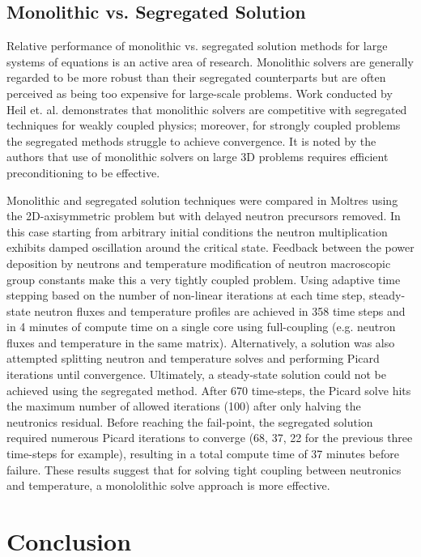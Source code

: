 \documentclass{article}
\let\Oldsection\section
\renewcommand{\section}{\FloatBarrier\Oldsection}
\let\Oldsubsection\subsection
\renewcommand{\subsection}{\FloatBarrier\Oldsubsection}
\begin{document}
\subsection{Monolithic vs. Segregated Solution}

Relative performance of monolithic vs. segregated solution methods for large
systems of equations is an active area of research. Monolithic solvers are
generally regarded to be more robust than their segregated counterparts but are
often perceived as being too expensive for large-scale problems. Work conducted
by Heil et. al. \cite{heil2008solvers} demonstrates that monolithic solvers are
competitive with segregated techniques for weakly coupled physics; moreover, for
strongly coupled problems the segregated methods struggle to achieve
convergence. It is noted by the authors that use of monolithic solvers
on large 3D problems requires efficient preconditioning to be effective.

Monolithic and segregated solution techniques were compared in Moltres using the
2D-axisymmetric problem but with delayed neutron precursors removed. In this
case starting from arbitrary initial conditions the neutron multiplication
exhibits damped oscillation around the critical state. Feedback between the
power deposition by neutrons and temperature modification of neutron macroscopic
group constants make this a very tightly coupled problem. Using adaptive time
stepping based on the number of non-linear iterations at each time step,
steady-state neutron fluxes and temperature profiles are achieved in 358 time
steps and in 4 minutes of compute time on a single core using full-coupling
(e.g. neutron fluxes and temperature in the same matrix). Alternatively,
a solution was also attempted splitting neutron and temperature solves and
performing Picard iterations until convergence. Ultimately, a steady-state
solution could not be achieved using the segregated method. After 670
time-steps, the Picard solve hits the maximum number of allowed iterations (100)
after only halving the neutronics residual. Before reaching the fail-point, the
segregated solution required numerous Picard iterations to converge (68, 37, 22
for the previous three time-steps for example), resulting in a total compute
time of 37 minutes before failure. These results suggest that for solving tight coupling
between neutronics and temperature, a monololithic solve approach is more effective.

\section{Conclusion}
\end{document}
